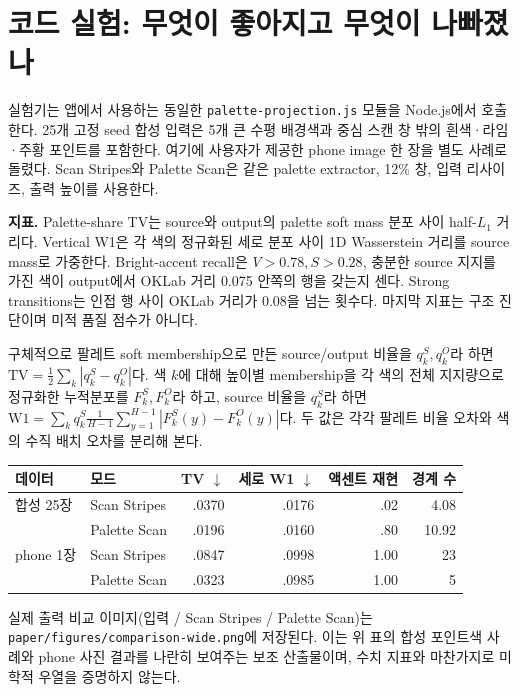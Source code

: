 \documentclass[10pt]{article}
\begin{document}
\section{코드 실험: 무엇이 좋아지고 무엇이 나빠졌나}
실험기는 앱에서 사용하는 동일한 \texttt{palette-projection.js} 모듈을 Node.js에서 호출한다. 25개 고정 seed 합성 입력은 5개 큰 수평 배경색과 중심 스캔 창 밖의 흰색·라임·주황 포인트를 포함한다. 여기에 사용자가 제공한 phone image 한 장을 별도 사례로 돌렸다. Scan Stripes와 Palette Scan은 같은 palette extractor, 12\% 창, 입력 리사이즈, 출력 높이를 사용한다.

\textbf{지표.} Palette-share TV는 source와 output의 palette soft mass 분포 사이 half-$L_1$ 거리다. Vertical W1은 각 색의 정규화된 세로 분포 사이 1D Wasserstein 거리를 source mass로 가중한다. Bright-accent recall은 $V>0.78,S>0.28$, 충분한 source 지지를 가진 색이 output에서 OKLab 거리 0.075 안쪽의 행을 갖는지 센다. Strong transitions는 인접 행 사이 OKLab 거리가 0.08을 넘는 횟수다. 마지막 지표는 구조 진단이며 미적 품질 점수가 아니다.

구체적으로 팔레트 soft membership으로 만든 source/output 비율을 $q^S_k,q^O_k$라 하면 $\mathrm{TV}=\frac12\sum_k|q^S_k-q^O_k|$다. 색 $k$에 대해 높이별 membership을 각 색의 전체 지지량으로 정규화한 누적분포를 $F^S_k,F^O_k$라 하고, source 비율을 $q^S_k$라 하면 $\mathrm{W1}=\sum_kq^S_k\frac{1}{H-1}\sum_{y=1}^{H-1}|F^S_k(y)-F^O_k(y)|$다. 두 값은 각각 팔레트 비율 오차와 색의 수직 배치 오차를 분리해 본다.

\begin{center}
\small
\begin{tabular}{@{}llrrrr@{}}
\toprule
데이터 & 모드 & TV $\downarrow$ & 세로 W1 $\downarrow$ & 액센트 재현 & 경계 수 \\
\midrule
합성 25장 & Scan Stripes & .0370 & .0176 & .02 & 4.08 \\
 & Palette Scan & .0196 & .0160 & .80 & 10.92 \\
phone 1장 & Scan Stripes & .0847 & .0998 & 1.00 & 23 \\
 & Palette Scan & .0323 & .0985 & 1.00 & 5 \\
\bottomrule
\end{tabular}
\end{center}

실제 출력 비교 이미지(입력 / Scan Stripes / Palette Scan)는 \texttt{paper/figures/comparison-wide.png}에 저장된다. 이는 위 표의 합성 포인트색 사례와 phone 사진 결과를 나란히 보여주는 보조 산출물이며, 수치 지표와 마찬가지로 미학적 우열을 증명하지 않는다.
\end{document}
